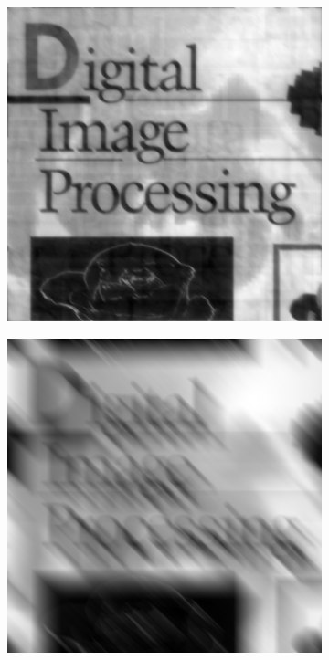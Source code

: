 \begin{figure}[h]
\begin{subfigure}[b]{0.3\linewidth}
		\caption{}
		\label{fig:5_inverse_006}
	\end{subfigure}
  	\begin{subfigure}[b]{0.3\linewidth}
		\includegraphics[width=\linewidth]{myfigure/p5/5_wiener_006.png}
		\caption{}
		\label{fig:5_wiener_006}
	\end{subfigure}
	\begin{subfigure}[b]{0.3\linewidth}
		\includegraphics[width=\linewidth]{myfigure/p5/5_blur.png}

\end{subfigure}
\end{figure}
